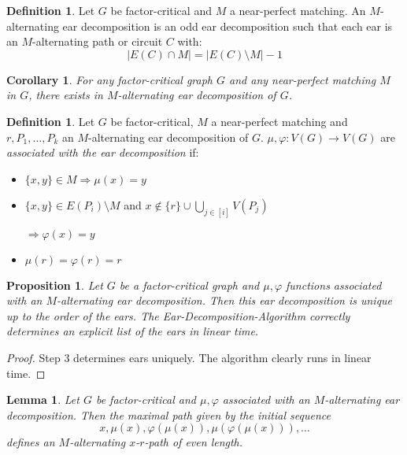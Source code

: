 \documentclass[11pt, a4paper]{article}
\newcommand{\abs}[1]{\left\lvert#1\right\rvert}
\newcommand{\set}[1]{\{#1\}}
\newtheorem{lemma}[theorem]{Lemma}
\newtheorem{cor}[theorem]{Corollary}
\newtheorem{prop}[theorem]{Proposition}
\theoremstyle{remark}
\theoremstyle{definition}
\newtheorem{definition}[theorem]{Definition}
\begin{document}
\begin{definition}
Let $G$ be factor-critical and $M$ a near-perfect matching.
An $M$-alternating ear decomposition is an odd ear decomposition
such that each ear is an $M$-alternating path or circuit $C$ with:
\[\abs{E(C)\cap M}=\abs{E(C)\setminus M}-1\]
\end{definition}

\begin{cor}
For any factor-critical graph $G$ and any near-perfect matching $M$ in $G$,
there exists in $M$-alternating ear decomposition of $G$.
\end{cor}

\begin{definition}
Let $G$ be factor-critical, $M$ a near-perfect matching and
$r,P_1,\ldots,P_k$ an $M$-alternating ear decomposition of $G$.
$\mu,\varphi: V(G)\to V(G)$ are \emph{associated with the ear
decomposition} if:
\begin{itemize}
	\item $\set{x,y}\in M\Rightarrow \mu(x)=y$
	\item $\set{x,y}\in E(P_i)\setminus M$ and $x\notin\set{r}
		\cup\bigcup_{j\in [i]}V(P_j)$

		$\Rightarrow \varphi(x)=y$
	\item $\mu(r)=\varphi(r)=r$
\end{itemize}
\end{definition}


\begin{prop}\label{lemma:ear-decomp-repr}
Let $G$ be a factor-critical graph and $\mu,\varphi$ functions associated
with an $M$-alternating ear decomposition. Then this ear decomposition is
unique up to the order of the ears. The Ear-Decomposition-Algorithm
correctly determines an explicit list of the ears in linear time.
\end{prop}
\begin{proof}
Step 3 determines ears uniquely. The algorithm clearly runs in linear
time.
\end{proof}

\begin{lemma}
Let $G$ be factor-critical and $\mu,\varphi$ associated with an
$M$-alternating ear decomposition. Then the maximal path given by the
initial sequence
\begin{equation}\label{eq:ear-alt-path}
x,\mu(x),\varphi(\mu(x)),\mu(\varphi(\mu(x))),\ldots
\end{equation}
defines an $M$-alternating $x$-$r$-path of even length.
\end{lemma}
\end{document}
